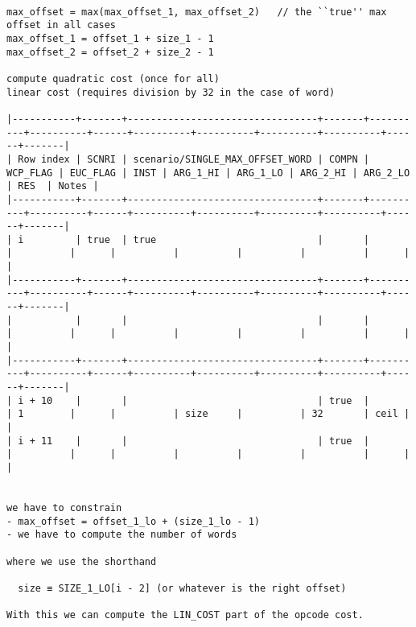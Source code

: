 \documentclass[varwidth=\maxdimen,margin=0.5cm,multi={verbatim}]{standalone}
\begin{document}
\begin{verbatim}

max_offset = max(max_offset_1, max_offset_2)   // the ``true'' max offset in all cases
max_offset_1 = offset_1 + size_1 - 1
max_offset_2 = offset_2 + size_2 - 1

compute quadratic cost (once for all)
linear cost (requires division by 32 in the case of word)

|-----------+-------+---------------------------------+-------+----------+----------+------+----------+----------+----------+----------+------+-------|
| Row index | SCNRI | scenario/SINGLE_MAX_OFFSET_WORD | COMPN | WCP_FLAG | EUC_FLAG | INST | ARG_1_HI | ARG_1_LO | ARG_2_HI | ARG_2_LO | RES  | Notes |
|-----------+-------+---------------------------------+-------+----------+----------+------+----------+----------+----------+----------+------+-------|
| i         | true  | true                            |       |          |          |      |          |          |          |          |      |       |
|-----------+-------+---------------------------------+-------+----------+----------+------+----------+----------+----------+----------+------+-------|
|           |       |                                 |       |          |          |      |          |          |          |          |      |       |
|-----------+-------+---------------------------------+-------+----------+----------+------+----------+----------+----------+----------+------+-------|
| i + 10    |       |                                 | true  |          | 1        |      |          | size     |          | 32       | ceil |       |
| i + 11    |       |                                 | true  |          |          |      |          |          |          |          |      |       |
     

we have to constrain
- max_offset = offset_1_lo + (size_1_lo - 1)
- we have to compute the number of words

where we use the shorthand

  size ≡ SIZE_1_LO[i - 2] (or whatever is the right offset)

With this we can compute the LIN_COST part of the opcode cost.

\end{verbatim}
\end{document}
